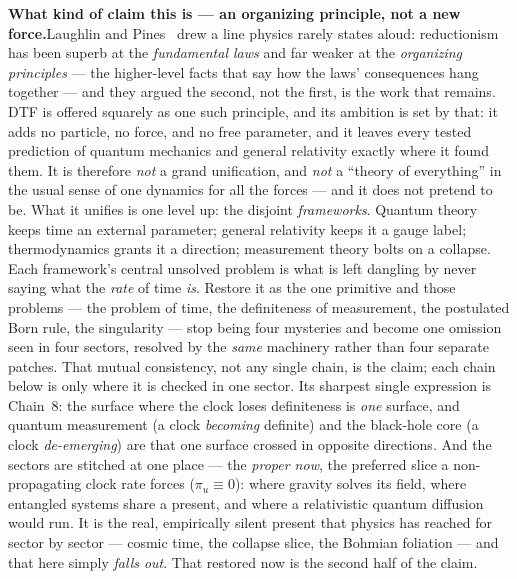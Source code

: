 \documentclass[11pt]{article}
\begin{document}
\textbf{What kind of claim this is --- an organizing principle, not a new force.}\enspace Laughlin and
Pines~\cite{LaughlinPines2000} drew a line physics rarely states aloud: reductionism has been superb at the
\emph{fundamental laws} and far weaker at the \emph{organizing principles} --- the higher-level facts that
say how the laws' consequences hang together --- and they argued the second, not the first, is the work that
remains. DTF is offered squarely as one such principle, and its ambition is set by that: it adds no
particle, no force, and no free parameter, and it leaves every tested prediction of quantum mechanics and
general relativity exactly where it found them. It is therefore \emph{not} a grand unification, and
\emph{not} a ``theory of everything'' in the usual sense of one dynamics for all the forces --- and it does
not pretend to be.
\smallskip
\noindent What it unifies is one level up: the disjoint \emph{frameworks}. Quantum theory keeps time an
external parameter; general relativity keeps it a gauge label; thermodynamics grants it a direction;
measurement theory bolts on a collapse. Each framework's central unsolved problem is what is left dangling
by never saying what the \emph{rate} of time \emph{is}. Restore it as the one primitive and those problems
--- the problem of time, the definiteness of measurement, the postulated Born rule, the singularity ---
stop being four mysteries and become one omission seen in four sectors, resolved by the \emph{same}
machinery rather than four separate patches. That mutual consistency, not any single chain, is the claim;
each chain below is only where it is checked in one sector. Its sharpest single expression is Chain~8: the
surface where the clock loses definiteness is \emph{one} surface, and quantum measurement (a clock
\emph{becoming} definite) and the black-hole core (a clock \emph{de-emerging}) are that one surface crossed
in opposite directions. And the sectors are stitched at one place --- the \emph{proper now}, the preferred
slice a non-propagating clock rate forces ($\pi_u\equiv0$): where gravity solves its field, where entangled
systems share a present, and where a relativistic quantum diffusion would run. It is the real, empirically
silent present that physics has reached for sector by sector --- cosmic time, the collapse slice, the
Bohmian foliation --- and that here simply \emph{falls out}. That restored now is the second half of the
claim.
\end{document}
